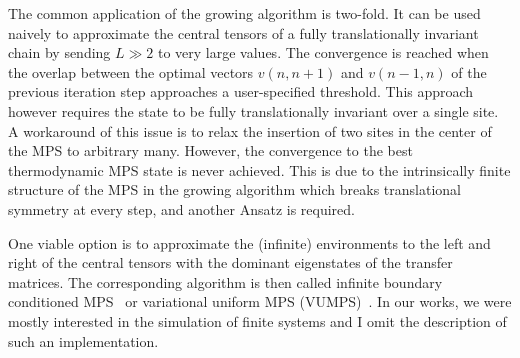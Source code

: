 The common application of the growing algorithm is two-fold.
It can be used naively to approximate the central tensors of a fully translationally invariant chain by sending $L\gg2$ to very large values.
The convergence is reached when the overlap between the optimal vectors $v(n,n+1)$ and $v(n-1,n)$ of the previous iteration step approaches a user-specified threshold.
This approach however requires the state to be fully translationally invariant over a single site.
A workaround of this issue is to relax the insertion of two sites in the center of the MPS to arbitrary many.
However, the convergence to the best thermodynamic MPS state is never achieved.
This is due to the intrinsically finite structure of the MPS in the growing algorithm which breaks translational symmetry at every step, and another Ansatz is required.

One viable option is to approximate the (infinite) environments to the left and right of the central tensors with the dominant eigenstates of the transfer matrices.
The corresponding algorithm is then called infinite boundary conditioned MPS~\cite{Phien2012} or variational uniform MPS (VUMPS)~\cite{ZaunerStauber2018}.
In our works, we were mostly interested in the simulation of finite systems and I omit the description of such an implementation.

